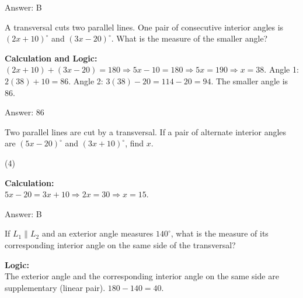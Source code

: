 \documentclass[11pt,paper=a4,answers]{exam}
\begin{document}
\begin{questions}
\begin{solution}
\vspace{30pt}

Answer: \colorbox{yellow!100}{B}
\end{solution}

\vspace{60pt}

\question
A transversal cuts two parallel lines. One pair of consecutive interior angles is $(2x + 10)^\circ$ and $(3x - 20)^\circ$. What is the measure of the smaller angle?

\begin{solution}
\textbf{Calculation and Logic:} \\
$(2x + 10) + (3x - 20) = 180 \Rightarrow 5x - 10 = 180 \Rightarrow 5x = 190 \Rightarrow x = 38$.
Angle 1: $2(38) + 10 = 86$.
Angle 2: $3(38) - 20 = 114 - 20 = 94$.
The smaller angle is 86.

\vspace{30pt}

Answer: \colorbox{yellow!100}{86}
\end{solution}

\vspace{60pt}

\question
Two parallel lines are cut by a transversal. If a pair of alternate interior angles are $(5x - 20)^\circ$ and $(3x + 10)^\circ$, find $x$.
\begin{tasks}(4)
\end{tasks}

\begin{solution}
\textbf{Calculation:} \\
$5x - 20 = 3x + 10 \Rightarrow 2x = 30 \Rightarrow x = 15$.

\vspace{30pt}

Answer: \colorbox{yellow!100}{B}
\end{solution}

\vspace{60pt}

\question
If $L_1 \parallel L_2$ and an exterior angle measures $140^\circ$, what is the measure of its corresponding interior angle on the same side of the transversal?

\begin{solution}
\textbf{Logic:} \\
The exterior angle and the corresponding interior angle on the same side are supplementary (linear pair). $180 - 140 = 40$.


\end{solution}
\end{questions}
\end{document}
